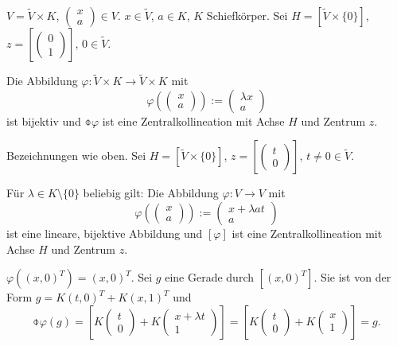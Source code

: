 \begin{exmp*}
 $V = \tilde{V} \times K$, $\begin{pmatrix} x \\ a \end{pmatrix} \in V$. $x \in \tilde{V}$, $a \in K$, $K$ Schiefkörper. Sei $H = [\tilde{V} \times \{ 0 \}]$, $z = \left[ \begin{pmatrix} 0 \\ 1 \end{pmatrix} \right]$, $0 \in \tilde{V}$. 
 
 Die Abbildung $\varphi : \tilde{V} \times K \to \tilde{V} \times K$ mit
 \[ \varphi\left( \begin{pmatrix} x \\ a \end{pmatrix} \right) := \begin{pmatrix} \lambda x \\ a \end{pmatrix} \]
 ist bijektiv und $\obar{\varphi}$ ist eine Zentralkollineation mit Achse $H$ und Zentrum $z$.
\end{exmp*}

\begin{exmp*}
 Bezeichnungen wie oben. Sei $H = [\tilde{V} \times \{ 0 \}]$, $z = \left[ \begin{pmatrix} t \\ 0 \end{pmatrix} \right]$, $t \ne 0 \in \tilde{V}$.
 
 Für $\lambda \in K \setminus \{ 0 \}$ beliebig gilt: Die Abbildung $\varphi: V \to V$ mit
 \[ \varphi\left( \begin{pmatrix} x \\ a \end{pmatrix} \right) := \begin{pmatrix} x + \lambda at \\ a \end{pmatrix} \]
 ist eine lineare, bijektive Abbildung und $[\varphi]$ ist eine Zentralkollineation mit Achse $H$ und Zentrum $z$.
 
 $\varphi( (x, 0)^T ) = ( x, 0 )^T$. Sei $g$ eine Gerade durch $[ (x, 0)^T ]$. Sie ist von der Form $g = K(t,0)^T + K(x,1)^T$ und
 \[ \obar{\varphi}(g) = \left[ K \begin{pmatrix} t \\ 0 \end{pmatrix} + K \begin{pmatrix} x+ \lambda t \\ 1 \end{pmatrix} \right] = \left[ K \begin{pmatrix} t \\ 0 \end{pmatrix} + K \begin{pmatrix} x \\ 1 \end{pmatrix} \right] = g. \]
\end{exmp*}


